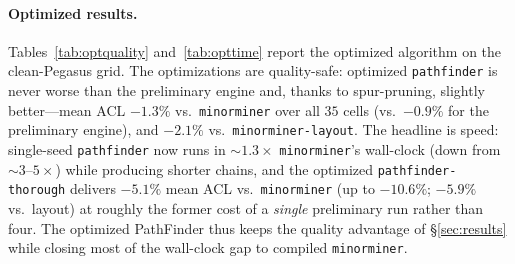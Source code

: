 \documentclass[acmsmall,anonymous,nonacm]{acmart}
\begin{document}
\paragraph{Optimized results.} Tables~\ref{tab:optquality} and~\ref{tab:opttime}
report the optimized algorithm on the clean-Pegasus grid. The optimizations are
quality-safe: optimized \texttt{pathfinder} is never worse than the preliminary
engine and, thanks to spur-pruning, slightly better---mean ACL $-1.3\%$ vs.\
\texttt{minorminer} over all $35$ cells (vs.\ $-0.9\%$ for the preliminary
engine), and $-2.1\%$ vs.\ \texttt{minorminer-layout}. The headline is speed:
single-seed \texttt{pathfinder} now runs in ${\sim}1.3\times$
\texttt{minorminer}'s wall-clock (down from ${\sim}3$--$5\times$) while producing
shorter chains, and the optimized \texttt{pathfinder-thorough} delivers $-5.1\%$
mean ACL vs.\ \texttt{minorminer} (up to $-10.6\%$; $-5.9\%$ vs.\ layout) at
roughly the former cost of a \emph{single} preliminary run rather than four. The
optimized PathFinder thus keeps the quality advantage of \S\ref{sec:results}
while closing most of the wall-clock gap to compiled \texttt{minorminer}.
\end{document}
